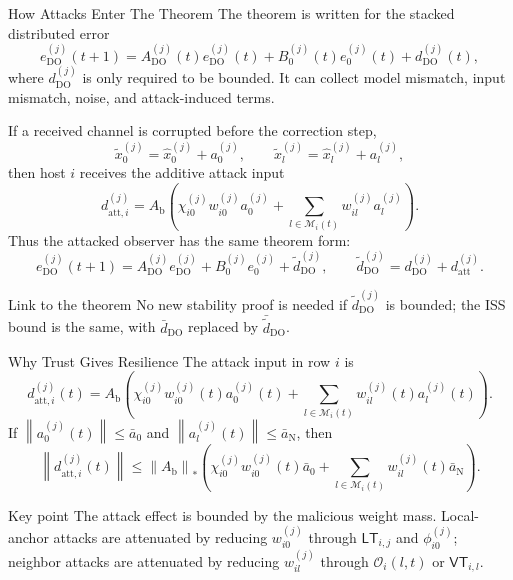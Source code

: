 \documentclass[aspectratio=169,10pt]{beamer}
\newcommand{\LT}{\mathsf{LT}}
\newcommand{\VT}{\mathsf{VT}}
\providecommand{\O}{}
\renewcommand{\O}{\mathcal{O}}
\newcommand{\norm}[1]{\left\lVert #1 \right\rVert}
\begin{document}
\begin{frame}{How Attacks Enter The Theorem}
\scriptsize
The theorem is written for the stacked distributed error
\[
e_{\mathrm{DO}}^{(j)}(t+1)
=A_{\mathrm{DO}}^{(j)}(t)e_{\mathrm{DO}}^{(j)}(t)
+B_0^{(j)}(t)e_0^{(j)}(t)
+d_{\mathrm{DO}}^{(j)}(t),
\tag{T}
\]
where $d_{\mathrm{DO}}^{(j)}$ is only required to be bounded. It can collect
model mismatch, input mismatch, noise, and attack-induced terms.

\vspace{0.5ex}
If a received channel is corrupted before the correction step,
\[
\tilde{x}_{0}^{(j)}=\hat{x}_{0}^{(j)}+a_0^{(j)},\qquad
\tilde{x}_{l}^{(j)}=\hat{x}_{l}^{(j)}+a_l^{(j)},
\]
then host $i$ receives the additive attack input
\[
d_{\mathrm{att},i}^{(j)}
=A_{\text{b}}\left(
\chi_{i0}^{(j)}w_{i0}^{(j)}a_0^{(j)}
+\sum_{l\in\mathcal{M}_i(t)}w_{il}^{(j)}a_l^{(j)}
\right).
\]
Thus the attacked observer has the same theorem form:
\[
e_{\mathrm{DO}}^{(j)}(t+1)
=A_{\mathrm{DO}}^{(j)}e_{\mathrm{DO}}^{(j)}
+B_0^{(j)}e_0^{(j)}
+\tilde d_{\mathrm{DO}}^{(j)},\qquad
\tilde d_{\mathrm{DO}}^{(j)}=d_{\mathrm{DO}}^{(j)}+d_{\mathrm{att}}^{(j)}.
\]
\begin{block}{Link to the theorem}
No new stability proof is needed if $\tilde d_{\mathrm{DO}}^{(j)}$ is bounded;
the ISS bound is the same, with $\bar d_{\mathrm{DO}}$ replaced by
$\bar{\tilde d}_{\mathrm{DO}}$.
\end{block}
\end{frame}

\begin{frame}{Why Trust Gives Resilience}
\small
The attack input in row $i$ is
\[
d_{\mathrm{att},i}^{(j)}(t)
=A_{\text{b}}
\left(
\chi_{i0}^{(j)}w_{i0}^{(j)}(t)a_0^{(j)}(t)
+\sum_{l\in\mathcal{M}_i(t)}
w_{il}^{(j)}(t)a_l^{(j)}(t)
\right).
\]
If $\norm{a_0^{(j)}(t)}\le\bar a_0$ and
$\norm{a_l^{(j)}(t)}\le\bar a_{\mathrm{N}}$, then
\[
\norm{d_{\mathrm{att},i}^{(j)}(t)}
\le
\norm{A_{\text{b}}}_*
\left(
\chi_{i0}^{(j)}w_{i0}^{(j)}(t)\bar a_0+
\sum_{l\in\mathcal{M}_i(t)}w_{il}^{(j)}(t)\bar a_{\mathrm{N}}
\right).
\]

\begin{block}{Key point}
The attack effect is bounded by the malicious weight mass. Local-anchor attacks
are attenuated by reducing $w_{i0}^{(j)}$ through $\LT_{i,j}$ and
$\phi_{i0}^{(j)}$; neighbor attacks are attenuated by reducing
$w_{il}^{(j)}$ through $\O_i(l,t)$ or $\VT_{i,l}$.
\end{block}
\end{frame}
\end{document}
